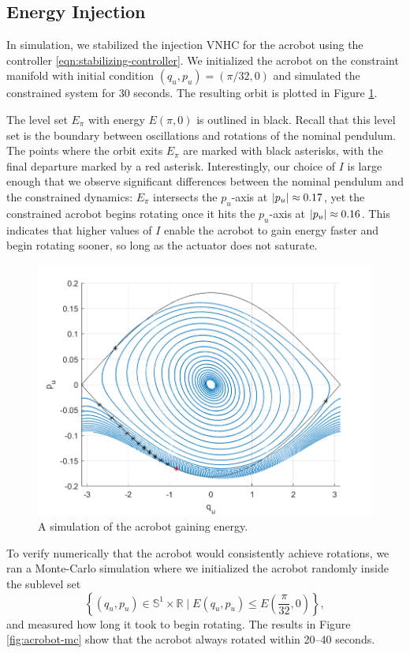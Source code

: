 \documentclass[journal,twoside,web, twocolumn,draftcls]{ieeecolor}
\DeclarePairedDelimiter{\abs}{\lvert}{\rvert}
\newcommand*{\R}{\mathbb{R}}
\newcommand*{\Sone}{\mathbb{S}^1}
\newcommand*{\SxR}{\Sone \times \R}
\begin{document}
\subsection{Energy Injection}

In simulation, we stabilized the injection VNHC for the acrobot using the
controller \eqref{eqn:stabilizing-controller}.
We initialized the acrobot on the constraint manifold
with initial condition \((q_u,p_u) = \left(\pi/32,0 \right)\) and simulated the
constrained system for \(30\) seconds.
The resulting orbit is plotted in Figure
\ref{fig:acrobot-in-orbit}.

The level set \(E_\pi\) with energy \(E(\pi,0)\) is outlined in black.
Recall that this level set is the boundary between oscillations and rotations of the
nominal pendulum.
The points where the orbit exits \(E_\pi\) are marked with black asterisks,
with the final departure marked by a red asterisk.
Interestingly, our choice of \(I\) is large enough that we observe significant
differences between the nominal pendulum and the constrained dynamics:
\(E_\pi\) intersects the \(p_u\)-axis at \(\abs{p_u} \approx 0.17\), yet the
constrained acrobot begins rotating once it hits the
\(p_u\)-axis at \(\abs{p_u} \approx 0.16\). 
This indicates that higher values of \(I\) enable the acrobot to gain energy
faster and begin rotating sooner, so long as the actuator does not saturate.

\begin{figure}[]
    \centering
    \includegraphics[width=0.8\linewidth]{acrobot_in_orbit.png}
    \caption{A simulation of the acrobot gaining energy.}
    \label{fig:acrobot-in-orbit}
\end{figure}

To verify numerically that the acrobot would consistently achieve rotations, we
ran a Monte-Carlo \cite{montecarlo} simulation where we initialized the acrobot
randomly inside the sublevel set
\[
    \left\{(q_u,p_u) \in \SxR \mid
    E(q_u,p_u) \leq E\left(\frac{\pi}{32},0\right)\right\}
    ,
\] 
and measured how long it took to begin rotating.
The results in Figure \ref{fig:acrobot-mc} show that
the acrobot always rotated within 20--40 seconds.
\end{document}
